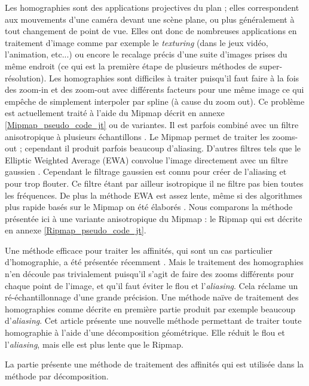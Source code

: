 Les homographies sont des applications projectives du plan ; elles correspondent aux mouvements d'une caméra devant une scène plane, ou plus généralement à tout changement de point de vue. Elles ont donc de nombreuses applications en traitement d'image comme par exemple le \emph{texturing} \cite{heckbert1983texture} (dans le jeux vidéo, l'animation, etc...) ou encore le recalage précis d'une suite d'images prises du même endroit \cite{brown2007automatic} (ce qui est la première étape de plusieurs méthodes de super-résolution). Les homographies sont difficiles à traiter puisqu'il faut faire à la fois des zoom-in et des zoom-out avec différents facteurs pour une même image ce qui empêche de simplement interpoler par spline (à cause du zoom out).  Ce problème est actuellement traité à l'aide du Mipmap \cite{williams1983pyramidal} décrit en annexe \ref{Mipmap_pseudo_code_jt} ou de variantes. Il est parfois combiné avec un filtre anisotropique à plusieurs échantillons  \cite{barkans1997high}. Le Mipmap permet de traiter les zooms-out ; cependant il produit parfois beaucoup d'aliasing.  D'autres filtres tels que le Elliptic Weighted Average (EWA) convolue l'image directement avec un filtre gaussien \cite{greene1986creating}. Cependant le filtrage gaussien est connu pour créer de l'aliasing et pour trop flouter. Ce filtre étant par ailleur isotropique il ne filtre pas bien toutes les fréquences. De plus la méthode EWA est assez lente, même si des algorithmes plus rapide basés sur le Mipmap on été élaborés \cite{mccormack1999feline,huttner1999fast}. Nous comparons la méthode présentée ici à une variante anisotropique du Mipmap : le Ripmap \cite{akenine2008real} qui est décrite en annexe \ref{Ripmap_pseudo_code_jt}.

	Une méthode efficace pour traiter les affinités, qui sont un cas particulier d'homographie, a été présentée récemment \cite{szeliski2010high}. Mais le traitement des homographies n'en découle pas trivialement puisqu'il s'agit de faire des zooms différents pour chaque point de l'image, et qu'il faut éviter le flou et l'\emph{aliasing}. Cela réclame un ré-échantillonnage d'une grande précision. Une méthode naïve de traitement des homographies comme décrite en première partie produit par exemple beaucoup d'\emph{aliasing}. Cet article présente une nouvelle méthode permettant de traiter toute homographie à l'aide d'une décomposition géométrique. Elle réduit le flou et l'\emph{aliasing}, mais elle est plus lente que le Ripmap.

	La partie \label{szeliski_section} présente une méthode de traitement des affinités qui est utilisée dans la méthode par décomposition.

